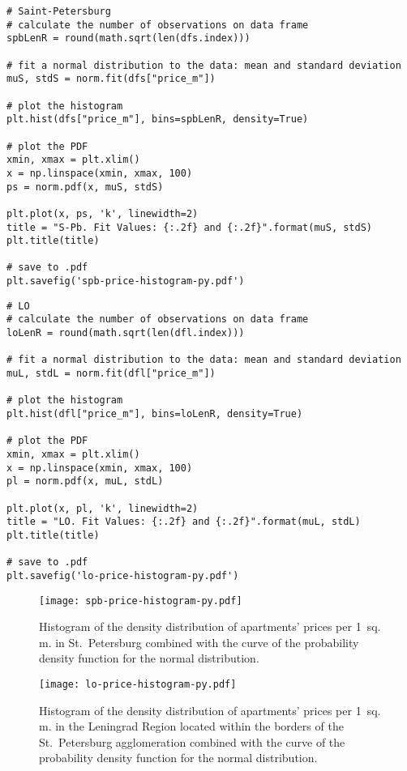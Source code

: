 \documentclass[]{scrreprt}
\begin{document}
%
\begin{lstlisting}[float, caption = Histogram plotting for St.~Petersburg., firstnumber=1, label= lst:price-hist-spb]
# Saint-Petersburg
# calculate the number of observations on data frame
spbLenR = round(math.sqrt(len(dfs.index)))

# fit a normal distribution to the data: mean and standard deviation
muS, stdS = norm.fit(dfs["price_m"])

# plot the histogram
plt.hist(dfs["price_m"], bins=spbLenR, density=True)

# plot the PDF
xmin, xmax = plt.xlim()
x = np.linspace(xmin, xmax, 100)
ps = norm.pdf(x, muS, stdS)

plt.plot(x, ps, 'k', linewidth=2)
title = "S-Pb. Fit Values: {:.2f} and {:.2f}".format(muS, stdS)
plt.title(title)

# save to .pdf
plt.savefig('spb-price-histogram-py.pdf')
\end{lstlisting}
%
\begin{lstlisting}[float, caption = Histogram plotting for the Leningrad Region, firstnumber=1, label= lst:price-hist-lo]
# LO
# calculate the number of observations on data frame
loLenR = round(math.sqrt(len(dfl.index)))

# fit a normal distribution to the data: mean and standard deviation
muL, stdL = norm.fit(dfl["price_m"])

# plot the histogram
plt.hist(dfl["price_m"], bins=loLenR, density=True)

# plot the PDF
xmin, xmax = plt.xlim()
x = np.linspace(xmin, xmax, 100)
pl = norm.pdf(x, muL, stdL)

plt.plot(x, pl, 'k', linewidth=2)
title = "LO. Fit Values: {:.2f} and {:.2f}".format(muL, stdL)
plt.title(title)

# save to .pdf
plt.savefig('lo-price-histogram-py.pdf')
\end{lstlisting} 
%
\begin{figure}[htp]
	\centering
	\texttt{[image: spb-price-histogram-py.pdf]}
	\caption{Histogram of the density distribution of apartments' prices per 1~sq.\,m. in St.~Petersburg combined with the curve of the probability density function for the normal distribution.}
	\label{fig:spb-prices-hist}
\end{figure}
%
\begin{figure}[htp]
	\centering
	\texttt{[image: lo-price-histogram-py.pdf]}
	\caption{Histogram of the density distribution of apartments' prices per 1~sq.\,m. in the Leningrad Region located within the borders of the St.~Petersburg agglomeration combined with the curve of the probability density function for the normal distribution.}
	\label{fig:lo-prices-hist}
\end{figure}
%
\end{document}
